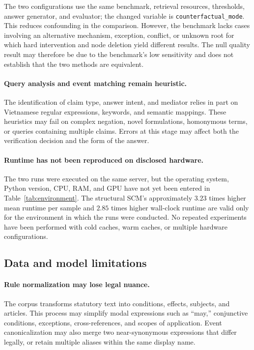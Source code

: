 The two configurations use the same benchmark, retrieval resources,
thresholds, answer generator, and evaluator; the changed variable is
\texttt{counterfactual\_mode}. This reduces confounding in the comparison.
However, the benchmark lacks cases involving an alternative mechanism,
exception, conflict, or unknown root for which hard intervention and node
deletion yield different results. The null quality result may therefore be
due to the benchmark's low sensitivity and does not establish that the two
methods are equivalent.

\paragraph{Query analysis and event matching remain heuristic.}

The identification of claim type, answer intent, and mediator relies in part
on Vietnamese regular expressions, keywords, and semantic mappings. These
heuristics may fail on complex negation, novel formulations, homonymous
terms, or queries containing multiple claims. Errors at this stage may affect
both the verification decision and the form of the answer.

\paragraph{Runtime has not been reproduced on disclosed hardware.}

The two runs were executed on the same server, but the operating system,
Python version, CPU, RAM, and GPU have not yet been entered in
Table~\ref{tab:environment}. The structural SCM's approximately $3.23$ times
higher mean runtime per sample and $2.85$ times higher wall-clock runtime are
valid only for the environment in which the runs were conducted. No repeated
experiments have been performed with cold caches, warm caches, or multiple
hardware configurations.

\subsection{Data and model limitations}

\paragraph{Rule normalization may lose legal nuance.}

The corpus transforms statutory text into conditions, effects, subjects, and
articles. This process may simplify modal expressions such as ``may,''
conjunctive conditions, exceptions, cross-references, and scopes of
application. Event canonicalization may also merge two near-synonymous
expressions that differ legally, or retain multiple aliases within the same
display name.

